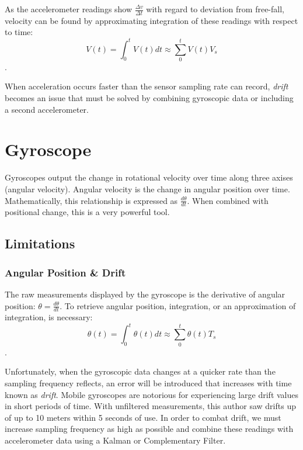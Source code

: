 \documentclass{acm_proc_article-sp}
\begin{document}
As the accelerometer readings show $\frac{\Delta v}{\Delta t}$ with regard to deviation from free-fall, velocity can be
found by approximating integration of these readings with respect to time:\cite{essl2007shamus}
 $$V(t) = \int_0^t V (t) dt \approx \displaystyle \sum \limits_{0}^t V (t)V_s$$.

When acceleration occurs faster than the sensor sampling rate can record, \textit{drift} becomes 
an issue that must be solved by combining gyroscopic data or including a second accelerometer.\cite{alves2003camera}

\section{Gyroscope}

Gyroscopes output the change in rotational velocity over time along three axises (angular velocity).
Angular velocity is the change in angular position over time.  Mathematically, this relationship is expressed
as $\frac{d\theta}{dt}$.\cite{gyro}
When combined with positional change, this is a very powerful tool.\cite{luinge2005measuring}

\subsection{Limitations}
\subsubsection{Angular Position \& Drift}

The raw measurements displayed by the gyroscope is the derivative of angular position: $\theta = \frac{d\theta}{dt}$.
To retrieve angular position, integration, or an approximation of integration, is necessary:
 $$\theta (t) = \int_0^t \theta (t) dt \approx \displaystyle \sum \limits_{0}^t \theta (t)T_s$$.\cite{gyro,luinge2005measuring}

Unfortunately, when the gyroscopic data changes at a quicker rate than the sampling
frequency reflects, an error will be introduced that increases with time known as \textit{drift}.\cite{luinge2005measuring} Mobile
gyroscopes are notorious for experiencing large drift values in short periods of time.  With unfiltered measurements, this author 
saw drifts up of up to 10 meters within 5 seconds of use.
In order to combat drift, we must increase sampling frequency as high as possible and
combine these readings with accelerometer data using a Kalman or Complementary Filter.\cite{gyro}  
\end{document}
